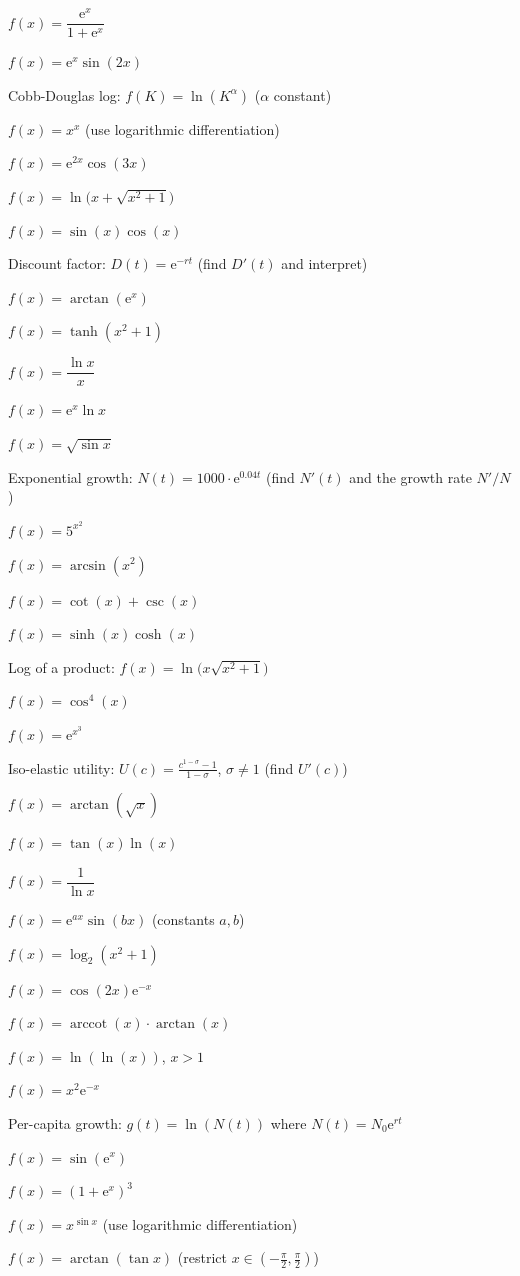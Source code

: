 \begin{problems}
  \item $f(x)=\dfrac{\mathrm{e}^{x}}{1+\mathrm{e}^{x}}$
  \item $f(x)=\mathrm{e}^{x}\sin(2x)$
  \item Cobb-Douglas log: $f(K)=\ln(K^{\alpha})$ \quad ($\alpha$ constant)
  \item $f(x)=x^{x}$ \quad (use logarithmic differentiation)
  \item $f(x)=\mathrm{e}^{2x}\cos(3x)$
  \item $f(x)=\ln\bigl(x+\sqrt{x^{2}+1}\bigr)$
  \item $f(x)=\sin(x)\cos(x)$
  \item Discount factor: $D(t)=\mathrm{e}^{-rt}$ \quad (find $D'(t)$ and
        interpret)
  \item $f(x)=\arctan(\mathrm{e}^{x})$
  \item $f(x)=\tanh(x^{2}+1)$
  \item $f(x)=\dfrac{\ln x}{x}$
  \item $f(x)=\mathrm{e}^{x}\ln x$
  \item $f(x)=\sqrt{\sin x}$
  \item Exponential growth: $N(t)=1000\cdot\mathrm{e}^{0.04t}$ \quad (find
        $N'(t)$ and the growth rate $N'/N$)
  \item $f(x)=5^{x^{2}}$
  \item $f(x)=\arcsin(x^{2})$
  \item $f(x)=\cot(x)+\csc(x)$
  \item $f(x)=\sinh(x)\cosh(x)$
  \item Log of a product: $f(x)=\ln\bigl(x\sqrt{x^{2}+1}\bigr)$
  \item $f(x)=\cos^{4}(x)$
  \item $f(x)=\mathrm{e}^{x^{3}}$
  \item Iso-elastic utility: $\displaystyle U(c)=\frac{c^{1-\sigma}-1}{1-\sigma}$,
        $\sigma\neq 1$ \quad (find $U'(c)$)
  \item $f(x)=\arctan(\sqrt{x})$
  \item $f(x)=\tan(x)\ln(x)$
  \item $f(x)=\dfrac{1}{\ln x}$
  \item $f(x)=\mathrm{e}^{ax}\sin(bx)$ \quad (constants $a,b$)
  \item $f(x)=\log_{2}(x^{2}+1)$
  \item $f(x)=\cos(2x)\mathrm{e}^{-x}$
  \item $f(x)=\operatorname{arccot}(x)\cdot\arctan(x)$ \quad [use
        $\operatorname{arccot}(x)=\tfrac{\pi}{2}-\arctan(x)$]
  \item $f(x)=\ln(\ln(x))$, \quad $x>1$
  \item $f(x)=x^{2}\mathrm{e}^{-x}$
  \item Per-capita growth: $g(t)=\ln(N(t))$ where $N(t)=N_{0}\mathrm{e}^{rt}$
  \item $f(x)=\sin(\mathrm{e}^{x})$
  \item $f(x)=(1+\mathrm{e}^{x})^{3}$
  \item $f(x)=x^{\sin x}$ \quad (use logarithmic differentiation)
  \item $f(x)=\arctan(\tan x)$ \quad (restrict $x\in(-\tfrac{\pi}{2},
        \tfrac{\pi}{2})$)
\end{problems}

